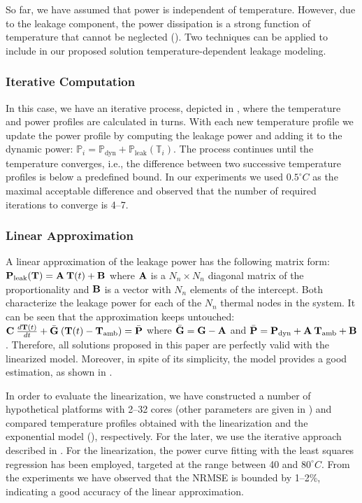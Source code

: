 So far, we have assumed that power is independent of temperature. However, due
to the leakage component, the power dissipation is a strong function of
temperature that cannot be neglected (). Two techniques can be
applied to include in our proposed solution temperature-dependent leakage
modeling.

\subsubsection{Iterative Computation}

In this case, we have an iterative process, depicted in , where
the temperature and power profiles are calculated in turns. With each new
temperature profile we update the power profile by computing the leakage power
and adding it to the dynamic power: $\mathbb{P}_i = \mathbb{P}_\text{dyn} +
\mathbb{P}_\text{leak}(\mathbb{T}_i)$. The process continues until the
temperature converges, i.e., the difference between two successive temperature
profiles is below a predefined bound. In our experiments we used $0.5^\circ C$
as the maximal acceptable difference and observed that the number of required
iterations to converge is 4--7.

\subsubsection{Linear Approximation}

A linear approximation of the leakage power has the following matrix form:
$\mathbf{P}_\text{leak}(\mathbf{T}) = \mathbf{A} \: \mathbf{T}(t) + \mathbf{B}$ where $\mathbf{A}$ is a $N_n
\times N_n$ diagonal matrix of the proportionality and $\mathbf{B}$ is a vector with
$N_n$ elements of the intercept. Both characterize the leakage power for each of
the $N_n$ thermal nodes in the system. It can be seen that the approximation
keeps  untouched: $\mathbf{C} \:
\frac{d\mathbf{T}(t)}{dt} + \bar{\mathbf{G}} \: (\mathbf{T}(t) - \mathbf{T}_{\mathrm{amb}}) = \bar{\mathbf{P}}$
where $\bar{\mathbf{G}} = \mathbf{G} - \mathbf{A}$ and $\bar{\mathbf{P}} = \mathbf{P}_\text{dyn} + \mathbf{A}
\: \mathbf{T}_{\mathrm{amb}} + \mathbf{B}$. Therefore, all solutions proposed in this paper are
perfectly valid with the linearized model. Moreover, in spite of its simplicity,
the model provides a good estimation, as shown in \cite{liu2007}.

In order to evaluate the linearization, we have constructed a number of
hypothetical platforms with 2--32 cores (other parameters are given in
) and compared temperature profiles obtained with the
linearization and the exponential model (), respectively. For
the later, we use the iterative approach described in .
For the linearization, the power curve fitting with the least squares regression
\cite{press2007} has been employed, targeted at the range between 40 and
$80^\circ C$. From the experiments we have observed that the NRMSE is bounded by
1--2\%, indicating a good accuracy of the linear approximation.


